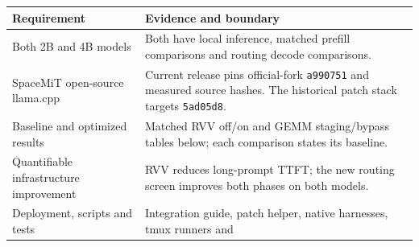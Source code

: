 \documentclass[10pt,a4paper]{article}
\begin{document}
\begin{longtable}[]{@{}ll@{}}
\toprule
\begin{minipage}[b]{0.47\columnwidth}\raggedright
Requirement\strut
\end{minipage} & \begin{minipage}[b]{0.47\columnwidth}\raggedright
Evidence and boundary\strut
\end{minipage}\tabularnewline
\midrule
\endhead
\begin{minipage}[t]{0.47\columnwidth}\raggedright
Both 2B and 4B models\strut
\end{minipage} & \begin{minipage}[t]{0.47\columnwidth}\raggedright
Both have local inference, matched prefill comparisons and routing
decode comparisons.\strut
\end{minipage}\tabularnewline
\begin{minipage}[t]{0.47\columnwidth}\raggedright
SpaceMiT open-source llama.cpp\strut
\end{minipage} & \begin{minipage}[t]{0.47\columnwidth}\raggedright
Current release pins official-fork \nolinkurl{a990751} and measured
source hashes. The historical patch stack targets
\nolinkurl{5ad05d8}.\strut
\end{minipage}\tabularnewline
\begin{minipage}[t]{0.47\columnwidth}\raggedright
Baseline and optimized results\strut
\end{minipage} & \begin{minipage}[t]{0.47\columnwidth}\raggedright
Matched RVV off/on and GEMM staging/bypass tables below; each comparison
states its baseline.\strut
\end{minipage}\tabularnewline
\begin{minipage}[t]{0.47\columnwidth}\raggedright
Quantifiable infrastructure improvement\strut
\end{minipage} & \begin{minipage}[t]{0.47\columnwidth}\raggedright
RVV reduces long-prompt TTFT; the new routing screen improves both
phases on both models.\strut
\end{minipage}\tabularnewline
\begin{minipage}[t]{0.47\columnwidth}\raggedright
Deployment, scripts and tests\strut
\end{minipage} & \begin{minipage}[t]{0.47\columnwidth}\raggedright
Integration guide, patch helper, native harnesses, tmux runners and

\end{minipage}
\end{longtable}
\end{document}
